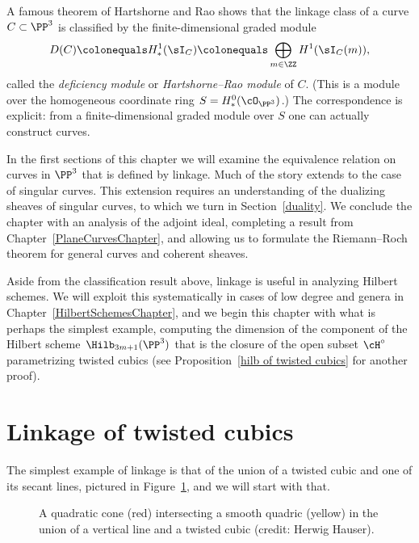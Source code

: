 A famous theorem of Hartshorne and Rao \cite{MR520926} shows that the
linkage class of a curve $C\subset \PP^3$
is classified by the finite-dimensional graded module
$$
D(C) \colonequals H^1_*(\sI_C)\colonequals \bigoplus_{m\in \ZZ}
H^1(\sI_C(m)),
$$
called the
\emph{deficiency module} or \emph{Hartshorne--Rao module}
%
%
of $C$. (This is a module over the
homogeneous coordinate ring $S = H^0_*(\cO_{\PP^3})$.) The correspondence
is explicit: from a finite-dimensional graded module over $S$ one can
actually construct curves.

In the first sections of this chapter we will examine the equivalence
relation on curves in $\PP^3$ that is defined by linkage. Much of the
story extends to the case of singular curves. This extension requires
an understanding of the dualizing sheaves of singular curves, to which
we turn in
%
Section~\ref{duality}. We conclude the chapter with an analysis of the
adjoint ideal, completing a result from
\null Chapter~\ref{PlaneCurvesChapter},
and allowing us to formulate
the Riemann--Roch theorem for general curves and coherent sheaves.

Aside from the classification result above, linkage is useful in analyzing
Hilbert schemes.
We will exploit this systematically in cases of low
degree and genera in Chapter~\ref{HilbertSchemesChapter}, and we begin
this chapter with what is perhaps the simplest example, computing the
dimension of the component of
%
the Hilbert scheme $\Hilb_{3m+1}(\PP^3)$ that is the closure of
the open subset $\cH^\circ$  parametrizing twisted cubics (see
Proposition~\ref{hilb of twisted cubics} for another proof).

\section{Linkage of twisted cubics}
The simplest example of linkage is that of the union of a
%
twisted cubic and one of its secant lines, pictured in
Figure~\ref{cubicAndLine}, and we will start with that.

\begin{figure}
\fboxsep=0pt
\caption{A quadratic cone (red) intersecting a smooth quadric (yellow) in
the union of a vertical line and a twisted cubic (credit: Herwig Hauser).}
\label{cubicAndLine}
\end{figure}

